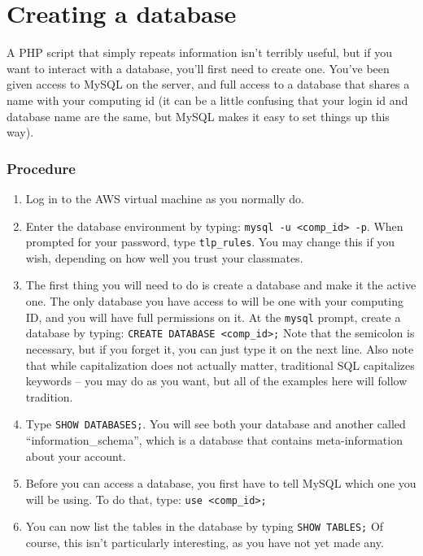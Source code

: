 \documentclass[11pt]{article} %
\begin{document}
\section{Creating a database}

A PHP script that simply repeats information isn’t terribly useful, but if you want to interact with a database, you’ll first need to create one. You’ve been given access to MySQL on the server, and full access to a database that shares a name with your computing id (it can be a little confusing that your login id and database name are the same, but MySQL makes it easy to set things up this way).

\subsubsection*{Procedure}

\begin{enumerate}
\item Log in to the AWS virtual machine as you normally do.
\item Enter the database environment by typing: \verb|mysql -u <comp_id> -p|. When prompted for your password, type \verb|tlp_rules|. You may change this if you wish, depending on how well you trust your classmates.
\item The first thing you will need to do is create a database and make it the active one. The only database you have access to will be one with your computing ID, and you will have full permissions on it. At the \verb|mysql| prompt, create a database by typing: \verb|CREATE DATABASE <comp_id>;| Note that the semicolon is necessary, but if you forget it, you can just type it on the next line. Also note that while capitalization does not actually matter, traditional SQL capitalizes keywords -- you may do as you want, but all of the examples here will follow tradition.
\item Type \verb|SHOW DATABASES;|. You will see both your database and another called “information\_schema”, which is a database that contains meta-information about your account.
\item Before you can access a database, you first have to tell MySQL which one you will be using. To do that, type: \verb|use <comp_id>;|
\item You can now list the tables in the database by typing \verb|SHOW TABLES;| Of course, this isn’t particularly interesting, as you have not yet made any.
\end{enumerate}
\end{document}
